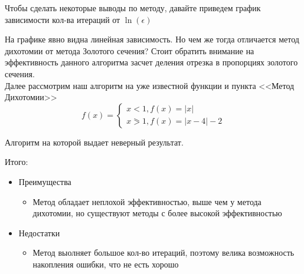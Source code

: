 \documentclass[a4paper, 14pt]{article}
\begin{document}
		Чтобы сделать некоторые выводы по методу, давайте приведем график зависимости кол-ва итераций от $\ln(\epsilon)$
		
	На графике явно видна линейная зависимость. Но чем же тогда отличается метод дихотомии от метода Золотого сечения? Стоит обратить внимание на эффективность данного алгоритма засчет деления отрезка в пропорциях золотого сечения. \\
	Далее рассмотрим наш алгоритм на уже известной функции и пункта <<Метод Дихотомии>>
	\begin{equation*}
		f(x) =
		\begin{cases}
			x < 1, f(x) = |x|\\
			x \eqslantgtr 1, f(x) = |x - 4| - 2
		\end{cases}
	\end{equation*}
	
	 Алгоритм на которой выдает неверный результат.
	 
	 Итого: 
	\begin{itemize}
		\item Преимущества
			\begin{itemize}
				\item Метод обладает неплохой эффективностью, выше чем у метода дихотомии, но существуют методы с более высокой эффективностью
			\end{itemize}
		\item Недостатки
			\begin{itemize}
			\item Метод выолняет большое кол-во итераций, поэтому велика возможность накопления ошибки, что не есть хорошо
			\end{itemize}
	\end{itemize}
	
	
\end{document}
